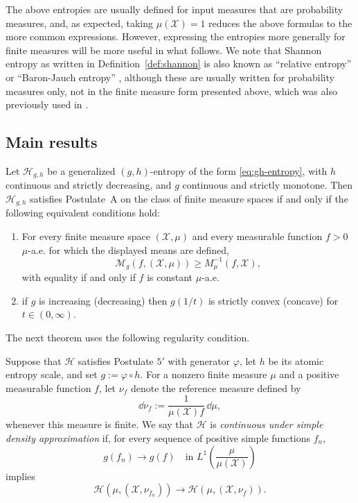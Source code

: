 \documentclass[reqno]{amsart}
\begin{document}
\begin{remark}
The above entropies are usually defined for input measures that are probability measures, and, as expected, taking $\mu(\mathcal{X}) = 1$  reduces the above formulas to the more common expressions. However, expressing the entropies more generally for finite measures will be more useful in what follows. We note that Shannon entropy as written in Definition~\ref{def:shannon} is also known as ``relative entropy'' or ``Baron-Jauch entropy'' \cite{BarJau72, Whe91}, although these are usually written for probability measures only, not in the finite measure form presented above, which was also previously used in \cite{Laz23}. 
\end{remark}

\subsection{Main results}

\begin{thm}
    \label{thm:ent-admit}
Let $\mathcal{H}_{g,h}$ be a generalized
$(g,h)$-entropy of the form \eqref{eq:gh-entropy}, with $h$ continuous  and strictly decreasing,
and $g$ continuous and strictly monotone. Then $\mathcal{H}_{g,h}$ satisfies Postulate~A
on the class of finite measure spaces if and only if the following equivalent
conditions hold:
\begin{enumerate}
  \item[(a)] For every finite measure space $(\mathcal{X},\mu)$ and every measurable function
$f>0$ $\mu$-a.e. for which the displayed means are defined,
  \begin{equation}
\label{eq:M-condition}
\mathcal{M}_g(f,(\mathcal{X},\mu))\geq M^{-1}_\mu(f,\mathcal{X}),
\end{equation}
with equality if and only if $f$ is constant $\mu$-a.e.
  \item[(b)] if $g$ is increasing (decreasing) then $g(1/t)$ is strictly convex (concave) for $t \in(0,\infty)$. 
\end{enumerate}
\end{thm}



The next theorem uses the following regularity condition.

\begin{definition}
\label{def:simple-density-continuity}
Suppose that $\mathcal H$ satisfies Postulate $5'$ with generator
$\varphi$, let $h$ be its atomic entropy scale, and set $g:=\varphi\circ h$.
For a nonzero finite measure $\mu$ and a positive measurable function
$f$, let $\nu_f$ denote the reference measure defined by
$$
\dd\nu_f
:=
\frac{1}{\mu(\mathcal X)f}\,\dd\mu,
$$
whenever this measure is finite. We say that $\mathcal H$ is
\textit{continuous under simple density approximation} if, for every
sequence of positive simple functions $f_n$,
$$
g(f_n)\longrightarrow g(f)
\quad\text{in }
L^1\left(\frac{\mu}{\mu(\mathcal X)}\right)
$$
implies
$$
\mathcal H(\mu,(\mathcal X,\nu_{f_n}))
\longrightarrow
\mathcal H(\mu,(\mathcal X,\nu_f)).
$$
\end{definition}
\end{document}
